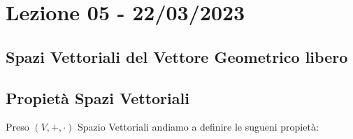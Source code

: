 \section{Lezione 05 - 22/03/2023}

\subsection{Spazi Vettoriali del Vettore Geometrico libero}

\subsection{Propietà Spazi Vettoriali}
Preso $(V, + , \cdot)$ Spazio Vettoriali andiamo a definire le sugueni propietà:
\begin{itemize}


\end{itemize}
